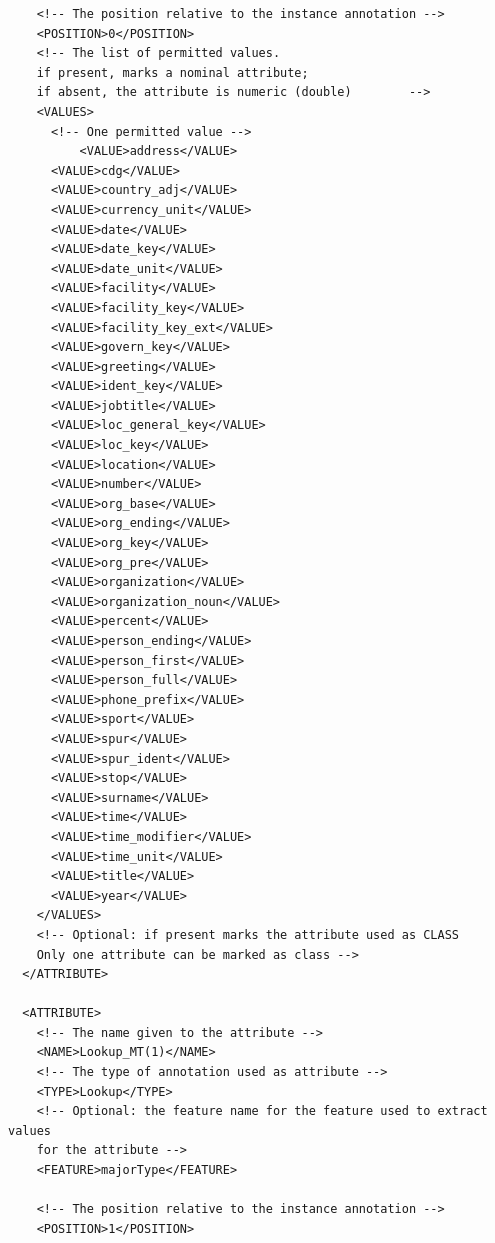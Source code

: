 \begin{verbatim}
    <!-- The position relative to the instance annotation -->
    <POSITION>0</POSITION>
    <!-- The list of permitted values.
    if present, marks a nominal attribute;
    if absent, the attribute is numeric (double)        -->
    <VALUES>
      <!-- One permitted value -->
          <VALUE>address</VALUE>
      <VALUE>cdg</VALUE>
      <VALUE>country_adj</VALUE>
      <VALUE>currency_unit</VALUE>
      <VALUE>date</VALUE>
      <VALUE>date_key</VALUE>
      <VALUE>date_unit</VALUE>
      <VALUE>facility</VALUE>
      <VALUE>facility_key</VALUE>
      <VALUE>facility_key_ext</VALUE>
      <VALUE>govern_key</VALUE>
      <VALUE>greeting</VALUE>
      <VALUE>ident_key</VALUE>
      <VALUE>jobtitle</VALUE>
      <VALUE>loc_general_key</VALUE>
      <VALUE>loc_key</VALUE>
      <VALUE>location</VALUE>
      <VALUE>number</VALUE>
      <VALUE>org_base</VALUE>
      <VALUE>org_ending</VALUE>
      <VALUE>org_key</VALUE>
      <VALUE>org_pre</VALUE>
      <VALUE>organization</VALUE>
      <VALUE>organization_noun</VALUE>
      <VALUE>percent</VALUE>  
      <VALUE>person_ending</VALUE>
      <VALUE>person_first</VALUE>
      <VALUE>person_full</VALUE>
      <VALUE>phone_prefix</VALUE>
      <VALUE>sport</VALUE>
      <VALUE>spur</VALUE>
      <VALUE>spur_ident</VALUE>
      <VALUE>stop</VALUE>
      <VALUE>surname</VALUE>
      <VALUE>time</VALUE>
      <VALUE>time_modifier</VALUE>
      <VALUE>time_unit</VALUE>
      <VALUE>title</VALUE>
      <VALUE>year</VALUE>
    </VALUES>
    <!-- Optional: if present marks the attribute used as CLASS
    Only one attribute can be marked as class -->
  </ATTRIBUTE>

  <ATTRIBUTE>
    <!-- The name given to the attribute -->
    <NAME>Lookup_MT(1)</NAME>
    <!-- The type of annotation used as attribute -->
    <TYPE>Lookup</TYPE>
    <!-- Optional: the feature name for the feature used to extract values
    for the attribute -->
    <FEATURE>majorType</FEATURE>

    <!-- The position relative to the instance annotation -->
    <POSITION>1</POSITION>


\end{verbatim}

